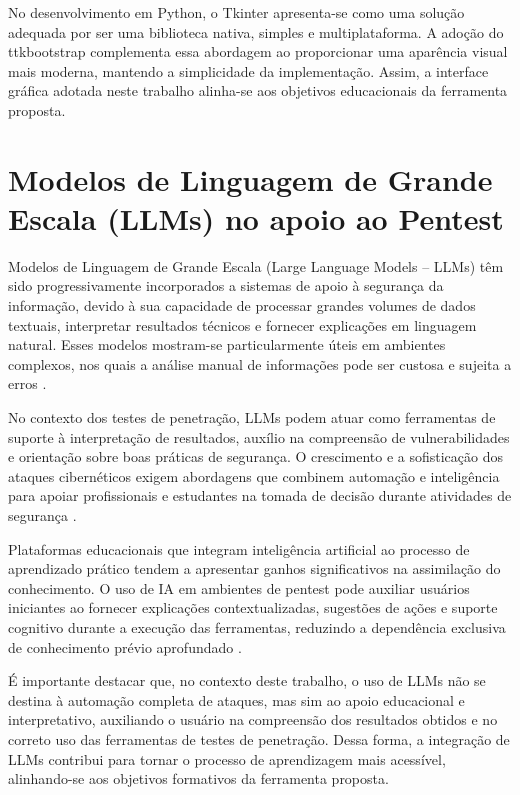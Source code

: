     No desenvolvimento em Python, o Tkinter apresenta-se como uma solução adequada por ser uma biblioteca nativa, simples
    e multiplataforma. A adoção do ttkbootstrap complementa essa abordagem ao proporcionar uma aparência visual mais
    moderna, mantendo a simplicidade da implementação. Assim, a interface gráfica adotada neste trabalho alinha-se aos
    objetivos educacionais da ferramenta proposta.

\section{Modelos de Linguagem de Grande Escala (LLMs) no apoio ao 
Pentest}
    Modelos de Linguagem de Grande Escala (Large Language Models – LLMs) têm sido progressivamente incorporados a sistemas de apoio
    à segurança da informação, devido à sua capacidade de processar grandes volumes de dados textuais, interpretar resultados técnicos
    e fornecer explicações em linguagem natural. Esses modelos mostram-se particularmente úteis em ambientes complexos, nos quais a
    análise manual de informações pode ser custosa e sujeita a erros \citep{ahmad2023zero}.

    No contexto dos testes de penetração, LLMs podem atuar como ferramentas de suporte à interpretação de resultados, auxílio na compreensão
    de vulnerabilidades e orientação sobre boas práticas de segurança. O crescimento e a sofisticação dos
    ataques cibernéticos exigem abordagens que combinem automação e inteligência para apoiar profissionais e estudantes na tomada
    de decisão durante atividades de segurança \citep{ahmad2023zero}.

    Plataformas educacionais que integram inteligência artificial ao processo de aprendizado prático tendem a apresentar ganhos significativos
    na assimilação do conhecimento. O uso de IA em ambientes de pentest pode auxiliar usuários iniciantes
    ao fornecer explicações contextualizadas, sugestões de ações e suporte cognitivo durante a execução das ferramentas, reduzindo a dependência
    exclusiva de conhecimento prévio aprofundado \citep{alaryani2024penthack}.

    É importante destacar que, no contexto deste trabalho, o uso de LLMs não se destina à automação completa de ataques, mas sim ao apoio educacional
    e interpretativo, auxiliando o usuário na compreensão dos resultados obtidos e no correto uso das ferramentas de testes de penetração. Dessa forma,
    a integração de LLMs contribui para tornar o processo de aprendizagem mais acessível, alinhando-se aos objetivos formativos da ferramenta proposta.





    

    

    


    
